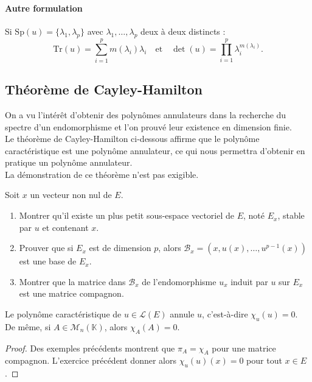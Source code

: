 \documentclass[french]{article}
\newcommand{\K}{\mathbb{K}}
\newcommand{\Tr}{\text{Tr}}
\newcommand{\Sp}{\text{Sp}}
\theoremstyle{plain}
\theoremstyle{definition}
\theoremstyle{remark}
\begin{document}
	\paragraph{Autre formulation} Si $\Sp(u)=\{\lambda_1,\lambda_p\}$ avec $\lambda_1,\ldots,\lambda_p$ deux à deux distincts : $$\Tr(u)=\sum_{i=1}^{p}m(\lambda_i)\lambda_i\quad\text{et}\quad\det(u)=\prod_{i=1}^{p}\lambda_i^{m(\lambda_i)}.$$
	
	\subsection{Théorème de Cayley-Hamilton}
	
	On a vu l'intérêt d'obtenir des polynômes annulateurs dans la recherche du spectre d'un endomorphisme et l'on prouvé leur existence en dimension finie.\\
	Le théorème de Cayley-Hamilton ci-dessous affirme que le polynôme caractéristique est une polynôme annulateur, ce qui nous permettra d'obtenir en pratique un polynôme annulateur.\\
	La démonstration de ce théorème n'est pas exigible.
	
	\begin{exo}
		Soit $x$ un vecteur non nul de $E$.
		\begin{enumerate}
			\item Montrer qu'il existe un plus petit sous-espace vectoriel de $E$, noté $E_x$, stable par $u$ et contenant $x$.
			\item Prouver que si $E_x$ est de dimension $p$, alors $\mathcal{B}_x=(x,u(x),\ldots,u^{p-1}(x))$ est une base de $E_x$.
			\item Montrer que la matrice dans $\mathcal{B}_x$ de l'endomorphisme $u_x$ induit par $u$ sur $E_x$ est une matrice compagnon.
		\end{enumerate}
	\end{exo}
	
	\begin{thm}%
		Le polynôme caractéristique de $u\in\mathcal{L}(E)$ annule $u$, c'est-à-dire $\chi_u(u)=0$.\\
		De même, si $A\in\mathcal{M}_n(\K)$, alors $\chi_A(A)=0$.
	\end{thm}
	\begin{proof}
		Des exemples précédents montrent que $\pi_A=\chi_A$ pour une matrice compagnon. L'exercice précédent donner alors $\chi_u(u)(x)=0$ pour tout $x\in E$.
	\end{proof}
	
\end{document}

